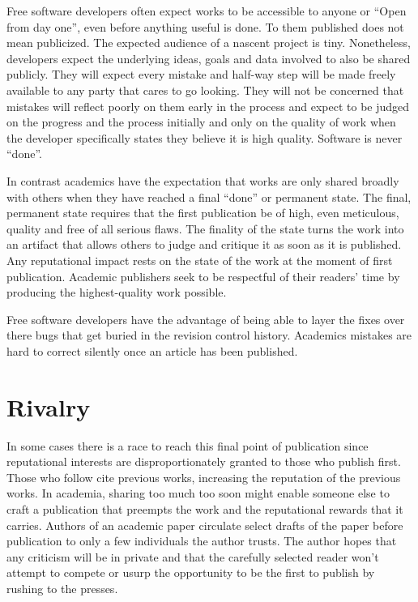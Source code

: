\documentclass[
	fontsize=10pt, %
	twoside=false, %
	secnumdepth=1, %
]{kaobook}
\begin{document}
Free software developers often expect works to be accessible to anyone
or “Open from day one”, even before anything useful is done. To them
published does not mean publicized. The expected audience of a nascent
project is tiny. Nonetheless, developers expect the underlying ideas,
goals and data involved to also be shared publicly. They will expect
every mistake and half-way step will be made freely available to any
party that cares to go looking. They will not be concerned that
mistakes will reflect poorly on them early in the process and expect
to be judged on the progress and the process initially and only on the
quality of work when the developer specifically states they believe it
is high quality. Software is never “done”.

In contrast academics have the expectation that works are only shared
broadly with others when they have reached a final “done” or permanent
state. The final, permanent state requires that the first publication
be of high, even meticulous, quality and free of all serious
flaws. The finality of the state turns the work into an artifact that
allows others to judge and critique it as soon as it is published. Any
reputational impact rests on the state of the work at the moment of
first publication. Academic publishers seek to be respectful of their
readers’ time by producing the highest-quality work possible.

Free software developers have the advantage of being able to layer the
fixes over there bugs that get buried in the revision control
history. Academics mistakes are hard to correct silently once an
article has been published.

\section{Rivalry}

In some cases there is a race to reach this final point of publication
since reputational interests are disproportionately granted to those
who publish first. Those who follow cite previous works, increasing
the reputation of the previous works. In academia, sharing too much
too soon might enable someone else to craft a publication that
preempts the work and the reputational rewards that it
carries. Authors of an academic paper circulate select drafts of the
paper before publication to only a few individuals the author
trusts. The author hopes that any criticism will be in private and
that the carefully selected reader won’t attempt to compete or usurp
the opportunity to be the first to publish by rushing to the presses.
\end{document}
